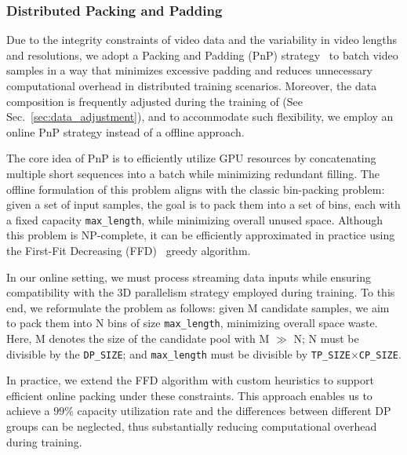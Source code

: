 
\subsubsection{Distributed Packing and Padding}\label{sec:train_infra_pnp}



Due to the integrity constraints of video data and the variability in video lengths and resolutions, we adopt a Packing and Padding (PnP) strategy~\citep{sirluk2024efficient, kundu2024enhancingtrainingefficiencyusing} to batch video samples in a way that minimizes excessive padding and reduces unnecessary computational overhead in distributed training scenarios. Moreover, the data composition is frequently adjusted during the training of \magi (See Sec.~\ref{sec:data_adjustment}), and to accommodate such flexibility, we employ an online PnP strategy instead of a offline approach.

The core idea of PnP is to efficiently utilize GPU resources by concatenating multiple short sequences into a batch while minimizing redundant filling. The offline formulation of this problem aligns with the classic bin-packing problem: given a set of input samples, the goal is to pack them into a set of bins, each with a fixed capacity \texttt{max\_length}, while minimizing overall unused space. Although this problem is NP-complete, it can be efficiently approximated in practice using the First-Fit Decreasing (FFD)~\citep{dosa2007tight} greedy algorithm.

In our online setting, we must process streaming data inputs while ensuring compatibility with the 3D parallelism strategy employed during training. To this end, we reformulate the problem as follows: given M candidate samples, we aim to pack them into N bins of size \texttt{max\_length}, minimizing overall space waste. Here, M denotes the size of the candidate pool with M $\gg$ N; N must be divisible by the \texttt{DP\_SIZE}; and \texttt{max\_length} must be divisible by \texttt{TP\_SIZE}$\times$\texttt{CP\_SIZE}.

In practice, we extend the FFD algorithm with custom heuristics to support efficient online packing under these constraints. This approach enables us to achieve a $99\%$ capacity utilization rate and the differences between different DP groups can be neglected, thus substantially reducing computational overhead during training.
































